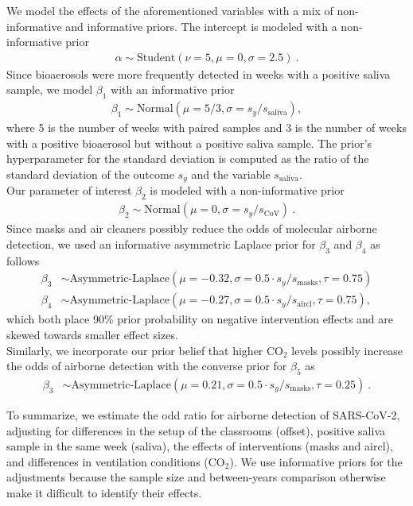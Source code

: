 \documentclass[fleqn,11pt]{wlscirep_supp}
\begin{document}
We model the effects of the aforementioned variables with a mix of  non-informative and informative priors. The intercept is modeled with a non-informative prior
\begin{align}
    \alpha \sim \text{Student}(\nu=5, \mu = 0, \sigma = 2.5) ~.
\end{align}
Since bioaerosols were more frequently detected in weeks with a positive saliva sample, we model $\beta_1$ with an informative prior
\begin{align}
    \beta_1 \sim \text{Normal}(\mu = 5/3, \sigma = s_y / s_{\text{saliva}}),
\end{align}
where 5 is the number of weeks with paired samples and 3 is the number of weeks with a positive bioaerosol but without a positive saliva sample. The prior's hyperparameter for the standard deviation is computed as the ratio of the standard deviation of the outcome $s_y$ and the variable $s_{\text{saliva}}$. \\
Our parameter of interest $\beta_2$ is modeled with a non-informative prior
\begin{align}
    \beta_2 \sim \text{Normal}(\mu = 0, \sigma = s_y / s_\text{CoV})~.
\end{align}
Since masks and air cleaners possibly reduce the odds of molecular airborne detection, we used an informative asymmetric Laplace prior for $\beta_3$ and $\beta_4$ as follows
\begin{align}
    \beta_3 &\sim \text{Asymmetric-Laplace}(\mu = -0.32, \sigma = 0.5\cdot s_y / s_{\text{masks}}, \tau = 0.75) \\
    \beta_4 &\sim \text{Asymmetric-Laplace}(\mu = -0.27, \sigma = 0.5\cdot s_y / s_{\text{aircl}}, \tau = 0.75),
\end{align}
which both place 90\% prior probability on negative intervention effects and are skewed towards smaller effect sizes. \\
Similarly, we incorporate our prior belief that higher CO$_2$ levels possibly increase the odds of airborne detection with the converse prior for $\beta_5$ as
\begin{align}
    \beta_3 &\sim \text{Asymmetric-Laplace}(\mu = 0.21, \sigma = 0.5\cdot s_y / s_{\text{masks}}, \tau = 0.25)~.
\end{align}

To summarize, we estimate the odd ratio for airborne detection of SARS-CoV-2, adjusting for differences in the setup of the classrooms (offset), positive saliva sample in the same week (saliva), the effects of interventions (masks and aircl), and differences in ventilation conditions (CO$_2$). We use informative priors for the adjustments because the sample size and between-years comparison otherwise make it difficult to identify their effects. 

\clearpage
\end{document}
